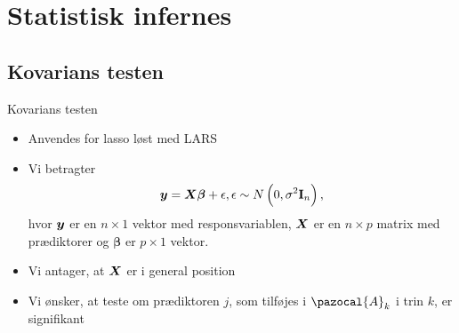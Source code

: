 \section{Statistisk infernes}





\subsection{Kovarians testen}
\begin{frame}{Kovarians testen}
\begin{itemize}
\item Anvendes for lasso løst med LARS
\item Vi betragter 
\begin{align*}
\vy = \vX \boldsymbol \beta + \epsilon, \epsilon \sim N\del{0, \sigma^2 \textbf{I}_n},
\end{align*}
hvor $\bm{y}$ er en $n \times 1$ vektor med responsvariablen, $\bm{X}$ er en $n \times p$ matrix med prædiktorer og $\boldsymbol \beta$ er $p \times 1$ vektor.
\item Vi antager, at $\bm{X}$ er i general position
\item Vi ønsker, at teste om prædiktoren $j$, som tilføjes i $\pazocal{A}_k$ i trin $k$, er signifikant
\end{itemize}
\end{frame}

